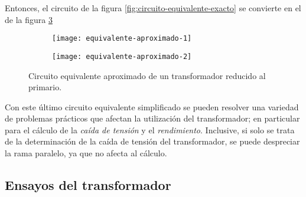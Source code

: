 Entonces, el circuito de la figura \ref{fig:circuito-equivalente-exacto} se convierte en el de la figura \ref{fig:aproximado-2}

\begin{figure}[H]
	\centering
	\begin{subfigure}[b]{0.4\textwidth}
		\centering
		\texttt{[image: equivalente-aproximado-1]}
		\subcaption{}
		\label{fig:aproximado-1}
	\end{subfigure}
	\begin{subfigure}[b]{0.4\textwidth}
		\centering
		\texttt{[image: equivalente-aproximado-2]}
		\subcaption{}
		\label{fig:aproximado-2}
	\end{subfigure}
	\caption{Circuito equivalente aproximado de un transformador reducido al primario.}
\end{figure}

Con este último circuito equivalente simplificado se pueden resolver una variedad de problemas prácticos que afectan la utilización del transformador; en particular para el cálculo de la \textsl{caída de tensión} y el \textsl{rendimiento}. Inclusive, si solo se trata de la determinación de la caída de tensión del transformador, se puede despreciar la rama paralelo, ya que no afecta al cálculo.

\subsection{Ensayos del transformador}
